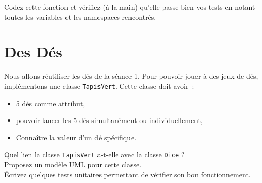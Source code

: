 \documentclass[12pt]{article}
\begin{document}
Codez cette fonction et vérifiez (à la main) qu'elle passe bien vos tests en notant toutes les variables et les namespaces rencontrés.

\section{Des Dés}

Nous allons réutiliser les dés de la séance 1. Pour pouvoir jouer à des jeux de dés, implémentons une classe
\verb|TapisVert|. Cette classe doit avoir~:
\begin{itemize}
	\item 5 dés comme attribut,
	\item pouvoir lancer les 5 dés simultanément ou individuellement,
	\item Connaître la valeur d'un dé spécifique.
\end{itemize}

Quel lien la classe \verb|TapisVert| a-t-elle avec la classe \verb|Dice| ?\\
Proposez un modèle UML pour cette classe.\\
Écrivez quelques tests unitaires permettant de vérifier son bon fonctionnement.\\
\end{document}
